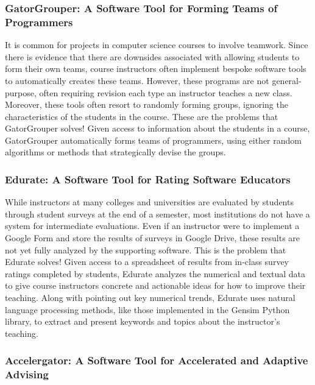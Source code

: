 \documentclass[11pt]{article}
\begin{document}
\subsubsection*{GatorGrouper: A Software Tool for Forming Teams of Programmers}

It is common for projects in computer science courses to involve teamwork. Since there is evidence that there are
downsides associated with allowing students to form their own teams, course instructors often implement bespoke software
tools to automatically creates these teams. However, these programs are not general-purpose, often requiring revision each
type an instructor teaches a new class. Moreover, these tools often resort to randomly forming groups, ignoring the
characteristics of the students in the course. These are the problems that GatorGrouper solves! Given access to
information about the students in a course, GatorGrouper automatically forms teams of programmers, using either random
algorithms or methods that strategically devise the groups.

\subsubsection*{Edurate: A Software Tool for Rating Software Educators}

While instructors at many colleges and universities are evaluated by students through student surveys at the end of a
semester, most institutions do not have a system for intermediate evaluations. Even if an instructor were to implement a
Google Form and store the results of surveys in Google Drive, these results are not yet fully analyzed by the supporting
software. This is the problem that Edurate solves! Given access to a spreadsheet of results from in-class survey ratings
completed by students, Edurate analyzes the numerical and textual data to give course instructors concrete and
actionable ideas for how to improve their teaching. Along with pointing out key numerical trends, Edurate uses natural
language processing methods, like those implemented in the Gensim Python library, to extract and present keywords and
topics about the instructor's teaching.

\vspace*{-.5em}

\subsubsection*{Accelergator: A Software Tool for Accelerated and Adaptive Advising}
\end{document}
